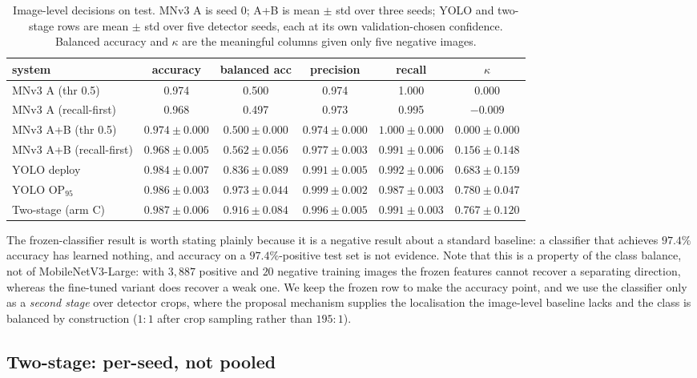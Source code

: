 \begin{table}[t]
\centering
\small
\caption{Image-level decisions on test. MNv3 A is seed 0; A+B is mean $\pm$ std
over three seeds; YOLO and two-stage rows are mean $\pm$ std over five detector
seeds, each at its own validation-chosen confidence. Balanced accuracy and
$\kappa$ are the meaningful columns given only five negative images.}
\label{tab:imagelevel}
\begin{tabular}{lccccc}
\toprule
system & accuracy & balanced acc & precision & recall & $\kappa$ \\
\midrule
MNv3 A (thr 0.5) & 0.974 & 0.500 & 0.974 & 1.000 & 0.000 \\
MNv3 A (recall-first) & 0.968 & 0.497 & 0.973 & 0.995 & $-0.009$ \\
MNv3 A+B (thr 0.5) & $0.974\pm0.000$ & $0.500\pm0.000$ & $0.974\pm0.000$ & $1.000\pm0.000$ & $0.000\pm0.000$ \\
MNv3 A+B (recall-first) & $0.968\pm0.005$ & $0.562\pm0.056$ & $0.977\pm0.003$ & $0.991\pm0.006$ & $0.156\pm0.148$ \\
YOLO deploy & $0.984\pm0.007$ & $0.836\pm0.089$ & $0.991\pm0.005$ & $0.992\pm0.006$ & $0.683\pm0.159$ \\
YOLO $\mathrm{OP}_{95}$ & $0.986\pm0.003$ & $0.973\pm0.044$ & $0.999\pm0.002$ & $0.987\pm0.003$ & $0.780\pm0.047$ \\
Two-stage (arm C) & $0.987\pm0.006$ & $0.916\pm0.084$ & $0.996\pm0.005$ & $0.991\pm0.003$ & $0.767\pm0.120$ \\
\bottomrule
\end{tabular}
\end{table}

The frozen-classifier result is worth stating plainly because it is a negative
result about a standard baseline: a classifier that achieves $97.4\%$ accuracy has
learned nothing, and accuracy on a $97.4\%$-positive test set is not evidence.
Note that this is a property of the class balance, not of MobileNetV3-Large: with
$3{,}887$ positive and $20$ negative training images the frozen features cannot
recover a separating direction, whereas the fine-tuned variant does recover a
weak one. We keep the frozen row to make the accuracy point, and we use the
classifier only as a \emph{second stage} over detector crops, where the proposal
mechanism supplies the localisation the image-level baseline lacks and the
class is balanced by construction ($1{:}1$ after crop sampling rather than
$195{:}1$).

\subsection{Two-stage: per-seed, not pooled}
\label{sec:twostage}

